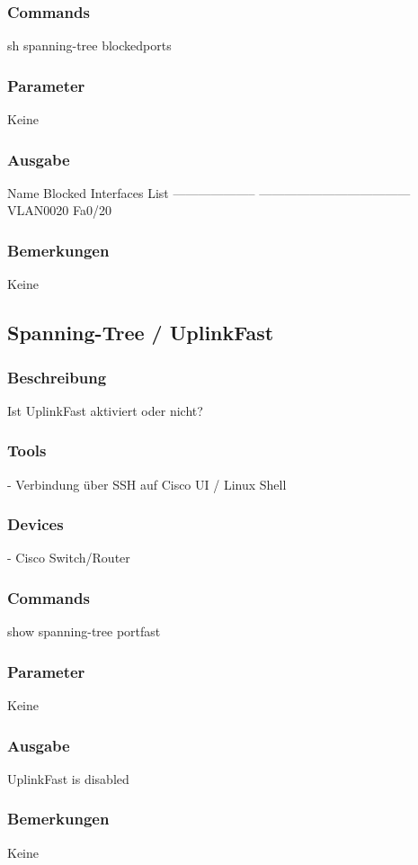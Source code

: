 \documentclass[a4,12pt]{scrartcl}
\begin{document}
\subsubsection{Commands}
sh spanning-tree blockedports
\subsubsection{Parameter}
Keine
\subsubsection{Ausgabe}
Name                 Blocked Interfaces List\newline
-------------------- ------------------------------------\newline
VLAN0020             Fa0/20\newline
\subsubsection{Bemerkungen}
Keine


\subsection{Spanning-Tree / UplinkFast}
\subsubsection{Beschreibung}
Ist UplinkFast aktiviert oder nicht?
\subsubsection{Tools}
- Verbindung über SSH auf Cisco UI / Linux Shell
\subsubsection{Devices}
- Cisco Switch/Router
\subsubsection{Commands}
show spanning-tree portfast
\subsubsection{Parameter}
Keine
\subsubsection{Ausgabe}
UplinkFast is disabled
\subsubsection{Bemerkungen}
Keine
\end{document}
